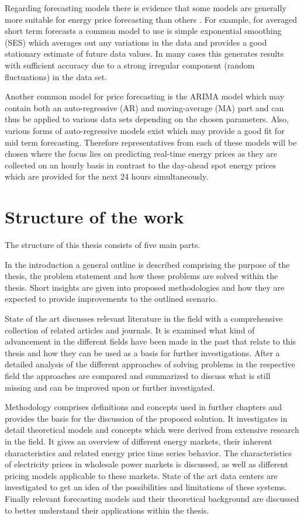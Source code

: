 Regarding forecasting models there is evidence that some models are generally more suitable for energy price forecasting than others \cite{weron2008forecasting}\cite{weron2005forecasting}. For example, for averaged short term forecasts a common model to use is simple exponential smoothing (SES) which averages out any variations in the data and provides a good stationary estimate of future data values. In many cases this generates results with sufficient accuracy due to a strong irregular component (random fluctuations) in the data set. 

Another common model for price forecasting is the ARIMA model which may contain both an auto-regressive (AR) and moving-average (MA) part and can thus be applied to various data sets depending on the chosen parameters. Also, various forms of auto-regressive models exist which may provide a good fit for mid term forecasting. 
Therefore representatives from each of these models will be chosen where the focus lies on predicting real-time energy prices as they are collected on an hourly basis in contrast to the day-ahead spot energy prices which are provided for the next 24 hours simultaneously. 

\section{Structure of the work}

The structure of this thesis consists of five main parts. 

In the introduction a general outline is described comprising the purpose of the thesis, the problem statement and how these problems are solved within the thesis. Short insights are given into proposed methodologies and how they are expected to provide improvements to the outlined scenario. 

State of the art discusses relevant literature in the field with a comprehensive collection of related articles and journals. It is examined what kind of advancement in the different fields have been made in the past that relate to this thesis and how they can be used as a basis for further investigations. After a detailed analysis of the different approaches of solving problems in the respective field the approaches are compared and summarized to discuss what is still missing and can be improved upon or further investigated. 

Methodology comprises definitions and concepts used in further chapters and provides the basis for the discussion of the proposed solution. It investigates in detail theoretical models and concepts which were derived from extensive research in the field. It gives an overview of different energy markets, their inherent characteristics and related energy price time series behavior. The characteristics of electricity prices in wholesale power markets is discussed, as well as different pricing models applicable to these markets. State of the art data centers are investigated to get an idea of the possibilities and limitations of these systems. Finally relevant forecasting models and their theoretical background are discussed to better understand their applications within the thesis. 

